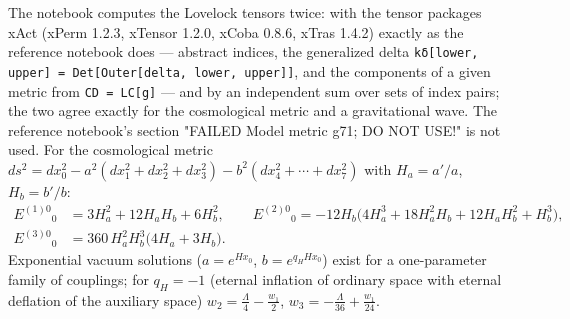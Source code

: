 \documentclass[10pt,a4paper]{article}
\begin{document}
The notebook computes the Lovelock tensors twice: with the tensor packages xAct (xPerm 1.2.3, xTensor 1.2.0, xCoba 0.8.6, xTras 1.4.2) exactly as the reference notebook does — abstract indices, the generalized delta \texttt{kδ[lower, upper] = Det[Outer[delta, lower, upper]]}, and the components of a given metric from \texttt{CD = LC[g]} — and by an independent sum over sets of index pairs; the two agree exactly for the cosmological metric and a gravitational wave. The reference notebook’s section "FAILED Model metric g71; DO NOT USE!" is not used. For the cosmological metric $ds^2=dx_0^2-a^2(dx_1^2+dx_2^2+dx_3^2)-b^2(dx_4^2+\cdots+dx_7^2)$ with $H_a=a'/a$, $H_b=b'/b$:
\begin{align*}
E^{(1)0}{}_0&=3H_a^2+12H_aH_b+6H_b^2,\qquad E^{(2)0}{}_0=-12H_b\big(4H_a^3+18H_a^2H_b+12H_aH_b^2+H_b^3\big), \\
E^{(3)0}{}_0&=360\,H_a^2H_b^3\big(4H_a+3H_b\big).
\end{align*}
Exponential vacuum solutions ($a=e^{Hx_0}$, $b=e^{q_HHx_0}$) exist for a one-parameter family of couplings; for $q_H=-1$ (eternal inflation of ordinary space with eternal deflation of the auxiliary space) $w_2=\frac{\Lambda}{4} - \frac{w_{1}}{2}$, $w_3=- \frac{\Lambda}{36} + \frac{w_{1}}{24}$.
\end{document}
